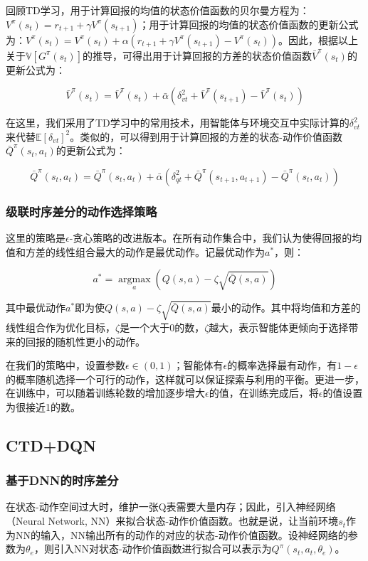 \documentclass[UTF8]{ctexart}
\begin{document}
回顾TD学习，用于计算回报的均值的状态价值函数的贝尔曼方程为：$V^{\pi}(s_t) = r_{t+1} + \gamma V^{\pi}(s_{t+1})$；用于计算回报的均值的状态价值函数的更新公式为：$V^{\pi}(s_t) = V^{\pi}(s_t) + \alpha (r_{t+1} + \gamma V^{\pi}(s_{t+1}) - V^{\pi}(s_t))$。因此，根据以上关于$\mathbb{V}[G^{\pi}(s_t)]$的推导，可得出用于计算回报的方差的状态价值函数$\bar{V}^{\pi}(s_t)$的更新公式为：

$$
\bar{V}^{\pi}(s_t) = \bar{V}^{\pi}(s_t) + \bar{\alpha}(\delta_{vt}^2 + \bar{V}^{\pi}(s_{t+1}) - \bar{V}^{\pi}(s_t))
$$

在这里，我们采用了TD学习中的常用技术，用智能体与环境交互中实际计算的$\delta_{vt}^2$来代替$\mathbb{E}[\delta_{vt}]^2$。类似的，可以得到用于计算回报的方差的状态-动作价值函数$\bar{Q}^{\pi}(s_t, a_t)$的更新公式为：

$$
\bar{Q}^{\pi}(s_t, a_t) = \bar{Q}^{\pi}(s_t, a_t) + \bar{\alpha}(\delta_{qt}^2 + \bar{Q}^{\pi}(s_{t+1}, a_{t+1}) - \bar{Q}^{\pi}(s_t, a_t))
$$

\subsubsection{级联时序差分的动作选择策略}

这里的策略是$\epsilon$-贪心策略的改进版本。在所有动作集合中，我们认为使得回报的均值和方差的线性组合最大的动作是最优动作。记最优动作为$a^*$，则：

$$a^* = \mathop{\arg\max}\limits_{a} (Q(s, a) - \zeta \sqrt{\bar{Q}(s, a)})$$

其中最优动作$a^*$即为使$Q(s, a) - \zeta \sqrt{\bar{Q}(s, a)}$最小的动作。其中将均值和方差的线性组合作为优化目标，$\zeta$是一个大于0的数，$\zeta$越大，表示智能体更倾向于选择带来的回报的随机性更小的动作。

在我们的策略中，设置参数$\epsilon \in (0, 1)$；智能体有$\epsilon$的概率选择最有动作，有$1-\epsilon$的概率随机选择一个可行的动作，这样就可以保证探索与利用的平衡。更进一步，在训练中，可以随着训练轮数的增加逐步增大$\epsilon$的值，在训练完成后，将$\epsilon$的值设置为很接近1的数。

\subsection{CTD+DQN}

\subsubsection{基于DNN的时序差分}

在状态-动作空间过大时，维护一张Q表需要大量内存；因此，引入神经网络（Neural Network, NN）来拟合状态-动作价值函数。也就是说，让当前环境$s_t$作为NN的输入，NN输出所有的动作的对应的状态-动作价值函数。设神经网络的参数为$\theta_e$，则引入NN对状态-动作价值函数进行拟合可以表示为$Q^\pi(s_t, a_t, \theta_e)$。
\end{document}
